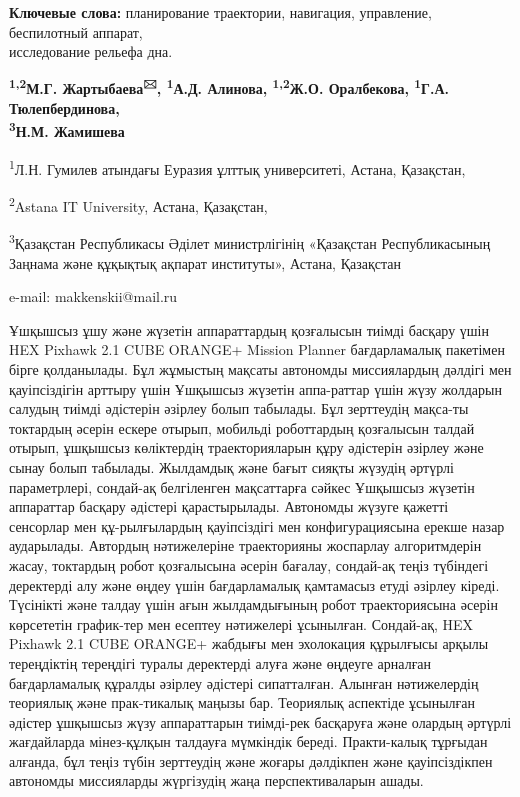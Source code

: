 {\bfseries Ключевые слова:} планирование траектории, навигация, управление,
беспилотный аппарат,\\исследование рельефа дна.


\begin{center}
{\bfseries \textsuperscript{1,2}М.Г. Жартыбаева\textsuperscript{🖂},
\textsuperscript{1}А.Д. Алинова, \textsuperscript{1,2}Ж.О. Оралбекова,
\textsuperscript{1}Г.А. Тюлепбердинова,\\
\textsuperscript{3}Н.М. Жамишева}

\textsuperscript{1}Л.Н. Гумилев атындағы Еуразия ұлттық университеті,
Астана, Қазақстан,

\textsuperscript{2}Astana IT University, Астана, Қазақстан,

\textsuperscript{3}Қазақстан Республикасы Әділет министрлігінің
«Қазақстан Республикасының Заңнама және құқықтық ақпарат институты», Астана, Қазақстан

e-mail: makkenskii@mail.ru
\end{center}

Ұшқышсыз ұшу және жүзетін аппараттардың қозғалысын тиімді басқару үшін
HEX Pixhawk 2.1 CUBE ORANGE+ Mission Planner бағдарламалық пакетімен
бірге қолданылады. Бұл жұмыстың мақсаты автономды миссиялардың дәлдігі
мен қауіпсіздігін арттыру үшін Ұшқышсыз жүзетін аппа-раттар үшін жүзу
жолдарын салудың тиімді әдістерін әзірлеу болып табылады. Бұл зерттеудің
мақса-ты токтардың әсерін ескере отырып, мобильді роботтардың қозғалысын
талдай отырып, ұшқышсыз көліктердің траекторияларын құру әдістерін
әзірлеу және сынау болып табылады. Жылдамдық және бағыт сияқты жүзудің
әртүрлі параметрлері, сондай-ақ белгіленген мақсаттарға сәйкес Ұшқышсыз
жүзетін аппараттар басқару әдістері қарастырылады. Автономды жүзуге
қажетті сенсорлар мен құ-рылғылардың қауіпсіздігі мен конфигурациясына
ерекше назар аударылады. Автордың нәтижелеріне траекторияны жоспарлау
алгоритмдерін жасау, токтардың робот қозғалысына әсерін бағалау,
сондай-ақ теңіз түбіндегі деректерді алу және өңдеу үшін бағдарламалық
қамтамасыз етуді әзірлеу кіреді. Түсінікті және талдау үшін ағын
жылдамдығының робот траекториясына әсерін көрсететін график-тер мен
есептеу нәтижелері ұсынылған. Сондай-ақ, HEX Pixhawk 2.1 CUBE ORANGE+
жабдығы мен эхолокация құрылғысы арқылы тереңдіктің тереңдігі туралы
деректерді алуға және өңдеуге арналған бағдарламалық құралды әзірлеу
әдістері сипатталған. Алынған нәтижелердің теориялық және прак-тикалық
маңызы бар. Теориялық аспектіде ұсынылған әдістер ұшқышсыз жүзу
аппараттарын тиімді-рек басқаруға және олардың әртүрлі жағдайларда
мінез-құлқын талдауға мүмкіндік береді. Практи-калық тұрғыдан алғанда,
бұл теңіз түбін зерттеудің және жоғары дәлдікпен және қауіпсіздікпен
автономды миссияларды жүргізудің жаңа перспективаларын ашады.

